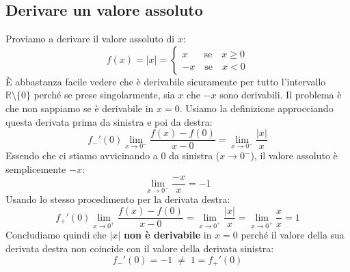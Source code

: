 \subsection{Derivare un valore assoluto}
Proviamo a derivare il valore assoluto di $x$:
\begin{equation*}
    f(x) = |x| =
    \begin{cases*}
        x \quad \;\;\, \text{se} \quad x \geq 0\\
        -x \quad \text{se} \quad x < 0
    \end{cases*}
\end{equation*}
È abbastanza facile vedere che è derivabile sicuramente per tutto l'intervallo 
$\mathbb{R} \setminus \{0\}$ perché se prese singolarmente, sia $x$ che $-x$ 
sono derivabili. Il problema è che non sappiamo se è derivabile in $x = 0$. 
Usiamo la definizione approcciando questa derivata prima da sinistra e poi da 
destra:
\begin{equation*}
	f_-' (0) \lim_{x \to 0^-} \dfrac{f(x) - f(0)}{x -0} = \lim_{x \to 0^-} 
    \dfrac{|x|}{x}
\end{equation*}
Essendo che ci stiamo avvicinando a $0$ da sinistra ($x \to 0^-$), il valore 
assoluto è semplicemente $-x$:
\begin{equation*}
	\lim_{x \to 0^-} \dfrac {-x}{x} = -1
\end{equation*} 
Usando lo stesso procedimento per la derivata destra:
\begin{equation*}
	f_+' (0) \lim_{x \to 0^+} \dfrac{f(x) - f(0)}{x -0} = \lim_{x \to 0^+} 
    \dfrac{|x|}{x} = \lim_{x \to 0^+} \dfrac {x}{x} = 1
\end{equation*}
Concludiamo quindi che $|x|$ \textbf{non è derivabile} in $x = 0$ perché il 
valore della sua derivata destra non coincide con il valore della derivata 
sinistra:
\begin{equation*}
	f_-' (0) = -1 \; \neq \; 1 = f_+'(0)
\end{equation*}

